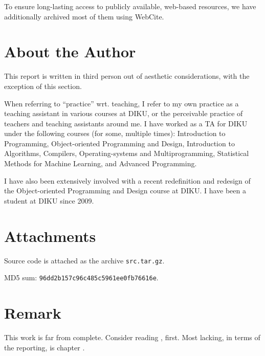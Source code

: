 To ensure long-lasting access to publicly available, web-based resources, we
have additionally archived most of them using
WebCite\textsuperscript{\textregistered}.

\section{About the Author}

This report is written in third person out of aesthetic considerations, with
the exception of this section.

When referring to ``practice'' wrt. teaching, I refer to my own practice as a
teaching assistant in various courses at DIKU, or the perceivable practice of
teachers and teaching assistants around me. I have worked as a TA for DIKU
under the following courses (for some, multiple times): Introduction to
Programming, Object-oriented Programming and Design, Introduction to
Algorithms, Compilers, Operating-systems and Multiprogramming, Statistical
Methods for Machine Learning, and Advanced Programming.

I have also been extensively involved with a recent redefinition and redesign
of the Object-oriented Programming and Design course at DIKU. I have been a
student at DIKU since 2009.

\section{Attachments}

Source code is attached as the archive \texttt{src.tar.gz}.

\noindent MD5 sum: \texttt{96dd2b157c96c485c5961ee0fb76616e}.

\section{Remark}

This work is far from complete. Consider reading ,
first. Most lacking, in terms of the reporting, is chapter
.
